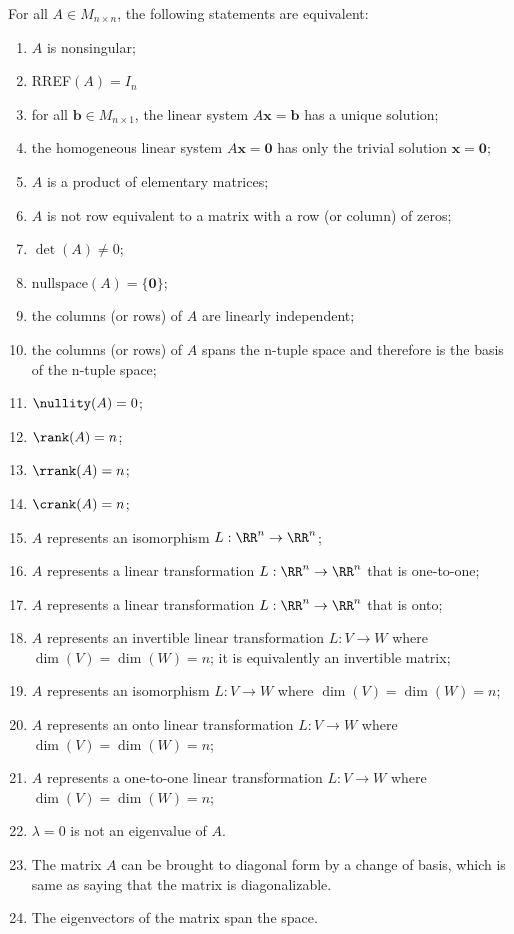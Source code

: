 \documentclass[main.tex]{subfiles}
\begin{document}
\noindent For all $A \in M_{n\times n}$, the following statements are equivalent:
\begin{enumerate}
\item\label{nonsing} $A$ is nonsingular;
\item\label{identity} RREF$(A) = I_n$
\item\label{unique solution} for all $\mathbf{b} \in M_{n\times 1}$, the linear system $A \mathbf{x} = \mathbf{b}$ has a unique solution;
\item\label{homogeneous} the homogeneous linear system $A \mathbf{x} = \mathbf{0}$ has only the trivial solution $\mathbf{x} = \mathbf{0}$;
\item\label{elementary} $A$ is a product of elementary matrices;
\item\label{no zero row} $A$ is not row equivalent to a matrix with a row (or column) of zeros;
\item\label{det nonzero} $\det(A) \not = 0$;
\item\label{null_space} $\mathrm{nullspace}(A) = \{\mathbf{0}\}$;
\item\label{cols_rows_independent} the columns (or rows) of $A$ are linearly independent;
\item\label{cols_rows_span} the columns (or rows) of $A$ spans the n-tuple space and therefore is the basis of the n-tuple space;
\item\label{nullity A} $\nullity(A) = 0$;
\item\label{rank A} $\rank(A) = n$;
\item\label{row rank} $\rrank(A) = n$;
\item\label{col rank} $\crank(A) = n$;
\item\label{isomorphism} $A$ represents an isomorphism $L:\RR^n \to \RR^n$;
\item\label{one-to-one} $A$ represents a linear transformation $L:\RR^n \to \RR^n$ that is one-to-one;
\item\label{onto} $A$ represents a linear transformation $L:\RR^n \to \RR^n$ that is onto;
\item \label{operator-invertible} $A$ represents an invertible linear transformation $L: V \to W$ where $\dim(V) = \dim(W) = n$; it is equivalently an invertible matrix;
\item \label{transf-iso} $A$ represents an isomorphism $L:V \to W$ where $\dim(V) = \dim(W) = n$;
\item \label{transf-onto} $A$ represents an onto linear transformation $L: V \to W$ where $\dim(V) = \dim(W) = n$;
\item \label{transf-one-to-one} $A$ represents a one-to-one linear transformation $L: V \to W$ where $\dim(V) = \dim(W) = n$;
\item \label{eigen} $\lambda = 0$ is not an eigenvalue of $A$.
\item The matrix $A$ can be brought to diagonal form by a change of basis, which is same as saying that the matrix is diagonalizable. 
\item The eigenvectors of the matrix span the space.  
\end{enumerate}
\end{document}
